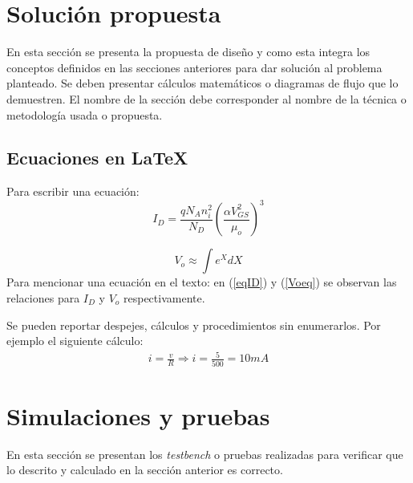 \section{Solución propuesta}
En esta sección se presenta la propuesta de diseño y como esta integra los conceptos definidos en las secciones anteriores para dar solución al problema planteado. Se deben presentar cálculos matemáticos o diagramas de flujo que lo demuestren. El nombre de la sección debe corresponder al nombre de la técnica o metodología usada o propuesta.

\subsection{Ecuaciones en \LaTeX}
Para escribir una ecuación:
\begin{equation}\label{eqID}
I_D=\frac{q N_A n_i^2}{N_D}\left(\frac{\alpha V_{GS}^2}{\mu_o}\right)^3
\end{equation}

\begin{equation}\label{Voeq} %
V_o \approx \int e^XdX
\end{equation}
Para mencionar una ecuación en el texto: en (\ref{eqID}) y (\ref{Voeq}) se observan las relaciones para $I_D$ y $V_o$ respectivamente.

Se pueden reportar despejes, cálculos y procedimientos sin enumerarlos. Por ejemplo el siguiente cálculo:
\begin{gather*}
i=\frac{v}{R}\Longrightarrow i=\frac{5}{500}=10 mA
\end{gather*}

\section{Simulaciones y pruebas}
En esta sección se presentan los \emph{testbench} o pruebas realizadas para verificar que lo descrito y calculado en la sección anterior es correcto.

